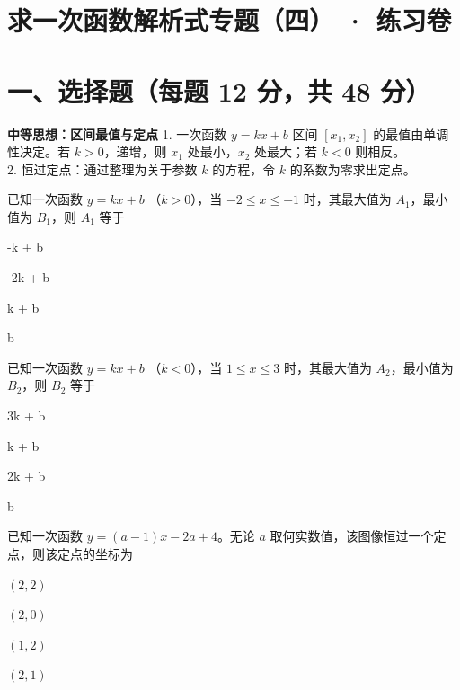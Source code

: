 \documentclass{exam-zh}
\begin{document}
\section*{求一次函数解析式专题（四） · 练习卷}

\section*{一、选择题（每题 12 分，共 48 分）}


\begin{keyideabox}
  \textbf{中等思想：区间最值与定点}
  1. 一次函数 $y=kx+b$ 区间 $[x_1, x_2]$ 的最值由单调性决定。若 $k>0$，递增，则 $x_1$ 处最小，$x_2$ 处最大；若 $k<0$ 则相反。\\ 2. 恒过定点：通过整理为关于参数 $k$ 的方程，令 $k$ 的系数为零求出定点。
\end{keyideabox}



\begin{question}[points=12]
  已知一次函数 $y = kx + b$ （$k > 0$），当 $-2 \leq x \leq -1$ 时，其最大值为 $A_1$，最小值为 $B_1$，则 $A_1$ 等于
  \begin{choices}
    \item -k + b
    \item -2k + b
    \item k + b
    \item b
  \end{choices}
\end{question}



\begin{question}[points=12]
  已知一次函数 $y = kx + b$ （$k < 0$），当 $1 \leq x \leq 3$ 时，其最大值为 $A_2$，最小值为 $B_2$，则 $B_2$ 等于
  \begin{choices}
    \item 3k + b
    \item k + b
    \item 2k + b
    \item b
  \end{choices}
\end{question}



\begin{question}[points=12]
  已知一次函数 $y = (a - 1)x - 2a + 4$。无论 $a$ 取何实数值，该图像恒过一个定点，则该定点的坐标为
  \begin{choices}
    \item $(2, 2)$
    \item $(2, 0)$
    \item $(1, 2)$
    \item $(2, 1)$
  \end{choices}
\end{question}
\end{document}
